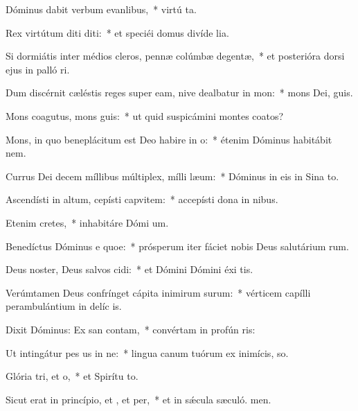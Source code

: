\item Dóminus dabit verbum evanlibus,~* virtú ta.
\item Rex virtútum diti diti:~* et speciéi domus divíde lia.
\item Si dormiátis inter médios cleros, pennæ colúmbæ degentæ,~* et posterióra dorsi ejus in palló ri.
\item Dum discérnit cæléstis reges super eam, nive dealbatur in mon:~* mons Dei,  guis.
\item Mons coagutus, mons guis:~* ut quid suspicámini montes coatos?
\item Mons, in quo beneplácitum est Deo habire in o:~* étenim Dóminus habitábit  nem.
\item Currus Dei decem míllibus múltiplex, mílli læum:~* Dóminus in eis in Sina  to.
\item Ascendísti in altum, cepísti capvitem:~* accepísti dona in nibus.
\item Etenim  cretes,~* inhabitáre Dómi um.
\item Benedíctus Dóminus e quoe:~* prósperum iter fáciet nobis Deus salutárium rum.
\item Deus noster, Deus salvos cidi:~* et Dómini Dómini éxi tis.
\item Verúmtamen Deus confrínget cápita inimirum surum:~* vérticem capílli perambulántium in delíc is.
\item Dixit Dóminus: Ex san contam,~* convértam in profún ris:
\item Ut intingátur pes us in ne:~* lingua canum tuórum ex inimícis,  so.
\item Glória tri, et o,~* et Spirítu to.
\item Sicut erat in princípio, et , et per,~* et in sǽcula sæculó. men.
